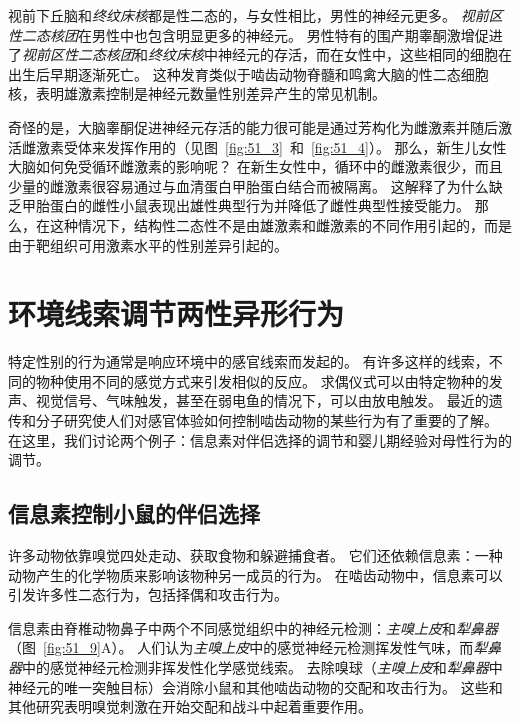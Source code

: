 视前下丘脑和\textit{终纹床核}都是性二态的，与女性相比，男性的神经元更多。
\textit{视前区性二态核团}在男性中也包含明显更多的神经元。
男性特有的围产期睾酮激增促进了\textit{视前区性二态核团}和\textit{终纹床核}中神经元的存活，而在女性中，这些相同的细胞在出生后早期逐渐死亡。
这种发育类似于啮齿动物脊髓和鸣禽大脑的性二态细胞核，表明雄激素控制是神经元数量性别差异产生的常见机制。


奇怪的是，大脑睾酮促进神经元存活的能力很可能是通过芳构化为雌激素并随后激活雌激素受体来发挥作用的（见图~\ref{fig:51_3}~和~\ref{fig:51_4}）。
那么，新生儿女性大脑如何免受循环雌激素的影响呢？
在新生女性中，循环中的雌激素很少，而且少量的雌激素很容易通过与血清蛋白甲胎蛋白结合而被隔离。
这解释了为什么缺乏甲胎蛋白的雌性小鼠表现出雄性典型行为并降低了雌性典型性接受能力。
那么，在这种情况下，结构性二态性不是由雄激素和雌激素的不同作用引起的，而是由于靶组织可用激素水平的性别差异引起的。



\section{环境线索调节两性异形行为}

特定性别的行为通常是响应环境中的感官线索而发起的。
有许多这样的线索，不同的物种使用不同的感觉方式来引发相似的反应。
求偶仪式可以由特定物种的发声、视觉信号、气味触发，甚至在弱电鱼的情况下，可以由放电触发。
最近的遗传和分子研究使人们对感官体验如何控制啮齿动物的某些行为有了重要的了解。
在这里，我们讨论两个例子：信息素对伴侣选择的调节和婴儿期经验对母性行为的调节。



\subsection{信息素控制小鼠的伴侣选择}
许多动物依靠嗅觉四处走动、获取食物和躲避捕食者。
它们还依赖信息素：一种动物产生的化学物质来影响该物种另一成员的行为。
在啮齿动物中，信息素可以引发许多性二态行为，包括择偶和攻击行为。


信息素由脊椎动物鼻子中两个不同感觉组织中的神经元检测：\textit{主嗅上皮}和\textit{犁鼻器}（图~\ref{fig:51_9}A）。
人们认为\textit{主嗅上皮}中的感觉神经元检测挥发性气味，而\textit{犁鼻器}中的感觉神经元检测非挥发性化学感觉线索。
去除嗅球（\textit{主嗅上皮}和\textit{犁鼻器}中神经元的唯一突触目标）会消除小鼠和其他啮齿动物的交配和攻击行为。
这些和其他研究表明嗅觉刺激在开始交配和战斗中起着重要作用。


